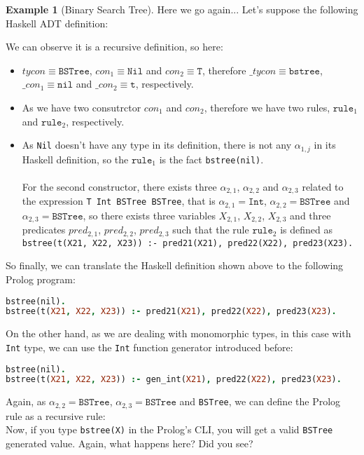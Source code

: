 \documentclass{report}
\theoremstyle{definition}
\newtheorem{example}{Example}[section]
\theoremstyle{definition}
\newcommand{\ttt}[1]{\texttt{#1}}
\begin{document}
\begin{example}[Binary Search Tree]
	Here we go again... Let's suppose the following Haskell ADT definition:
	
	We can observe it is a recursive definition, so here:
	\begin{itemize}
		\item $tycon \equiv \ttt{BSTree}$, $con_1 \equiv \ttt{Nil}$ and $con_2 \equiv \ttt{T}$, therefore $\_tycon \equiv \ttt{bstree}$, $\_con_1 \equiv \ttt{nil}$ and $\_con_2 \equiv \ttt{t}$, respectively.
		\item As we have two consutrctor $con_1$ and $con_2$, therefore we have two rules, $\ttt{rule}_1$ and $\ttt{rule}_2$, respectively.
		\item As \ttt{Nil} doesn't have any type in its definition, there is not any $\alpha_{1,j}$ in its Haskell definition, so the $\ttt{rule}_1$ is the fact \ttt{bstree(nil)}.\\\\
		      For the second constructor, there exists three $\alpha_{2,1}$, $\alpha_{2,2}$ and $\alpha_{2,3}$ related to the expression \ttt{T Int BSTree BSTree}, that is $\alpha_{2,1} = \ttt{Int}$, $\alpha_{2,2} = \ttt{BSTree}$ and $\alpha_{2,3} = \ttt{BSTree}$, so there exists three variables $X_{2,1}$, $X_{2,2}$, $X_{2,3}$ and three predicates $pred_{2,1}$, $pred_{2,2}$, $pred_{2,3}$ such that the rule $\ttt{rule}_2$ is defined as \\ \ttt{bstree(t(X21, X22, X23)) :- pred21(X21), pred22(X22), pred23(X23).}
	\end{itemize}
	So finally, we can translate the Haskell definition shown above to the following Prolog program:\\
	\begin{lstlisting}[language=Prolog]
bstree(nil).																														%% rule 1
bstree(t(X21, X22, X23)) :- pred21(X21), pred22(X22), pred23(X23).			%% rule 2
	\end{lstlisting}
	On the other hand, as we are dealing with monomorphic types, in this case with \ttt{Int} type, we can use the \ttt{Int} function generator introduced before:\\
	\begin{lstlisting}[language=Prolog]
bstree(nil).																														%% rule 1
bstree(t(X21, X22, X23)) :- gen_int(X21), pred22(X22), pred23(X23).			%% rule 2
	\end{lstlisting}
	Again, as $\alpha_{2,2} = \ttt{BSTree}$, $\alpha_{2,3} = \ttt{BSTree}$ and \ttt{BSTree}, we can define the Prolog rule as a recursive rule:\\
	
	Now, if you type \ttt{bstree(X)} in the Prolog's CLI, you will get a valid \ttt{BSTree} generated value. Again, what happens here? Did you see?\\
\end{example}
\end{document}
